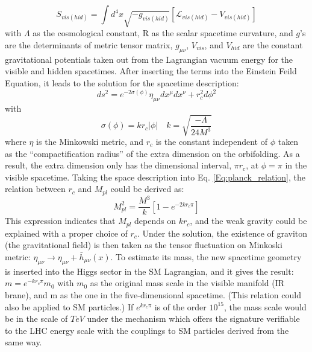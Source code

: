 \begin{equation}
S_{vis(hid)} = \int d^4x\sqrt{-g_{vis(hid)}}\left[\mathcal{L}_{vis(hid)}-V_{vis(hid)}\right]
\end{equation}
with $\Lambda$ as the cosmological constant, R as the scalar spacetime curvature, and $g$'s are the determinants of metric tensor matrix,  $g_{\mu\nu}$, $V_{vis}$, and $V_{hid}$ are the constant gravitational potentials taken out from the Lagrangian vacuum energy for the visible and hidden spacetimes. After inserting the terms into the Einstein Feild Equation, it leads to the solution for the spacetime description:
\begin{equation}
ds^2=e^{-2\sigma(\phi)}\eta_{\mu\nu}dx^\mu dx^\nu + r_c^2 d\phi^2
\end{equation}
with
\begin{equation}
\sigma(\phi) = kr_c|\phi| \quad k=\sqrt{\frac{-\Lambda}{24M^3}}
\end{equation}
where $\eta$ is the Minkowski metric, and $r_{c}$ is the constant independent of $\phi$ taken as the ``compactification radius'' of the extra dimension on the orbifolding. As a result, the extra dimension only has the dimensional interval, $\pi r_{c}$, at $\phi=\pi$ in the visible spacetime. Taking the space description into Eq. \ref{Eq:planck_relation}, the relation between $r_c$ and $M_{pl}$ could be derived as:
\begin{equation}
M_{pl}^2=\frac{M^3}{k}\left[1-e^{-2kr_{c}\pi}\right]
\end{equation}
This expression indicates that $M_{pl}$ depends on $kr_{c}$, and the weak gravity could be explained with a proper choice of $r_c$. Under the solution, the existence of graviton (the gravitational field) is then taken as the tensor fluctuation on Minkoski metric: $\eta_{\mu\nu} \rightarrow \eta_{\mu\nu}+\bar{h}_{\mu\nu}(x)$. To estimate its mass, the new spacetime geometry is inserted into the Higgs sector in the SM Lagrangian, and it gives the result: $m=e^{-kr_{c}\pi}m_{0}$ with $m_{0}$ as the original mass scale in the visible manifold (IR brane), and m as the one in the five-dimensional spacetime. (This relation could also be applied to SM particles.) If $e^{kr_{c}\pi}$ is of the order $10^{15}$, the mass scale would be in the scale of $TeV$ under the mechanism which offers the signature verifiable to the LHC energy scale with the couplings to SM particles derived from the same way.
